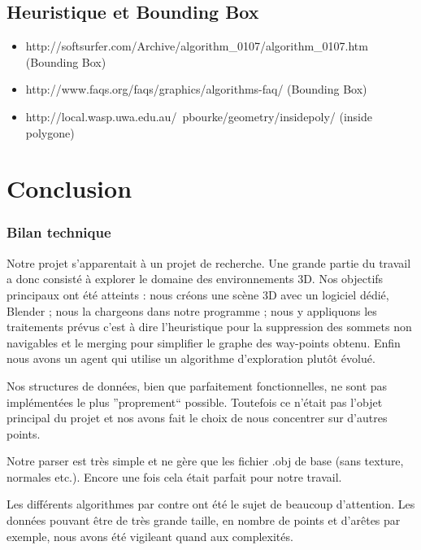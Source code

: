 \documentclass[a4paper,12pt]{report}
\begin{document}
 

\section*{Heuristique et Bounding Box}
\begin{itemize}
 \item http://softsurfer.com/Archive/algorithm\_0107/algorithm\_0107.htm  (Bounding Box)
 
 \item http://www.faqs.org/faqs/graphics/algorithms-faq/  (Bounding Box)
 
 \item http://local.wasp.uwa.edu.au/~pbourke/geometry/insidepoly/  (inside polygone)
\end{itemize} 

\chapter{Conclusion}

\subsection*{Bilan technique}

Notre projet s'apparentait à un projet de recherche. Une grande partie du travail a donc consisté à explorer le domaine des environnements 3D. Nos objectifs principaux ont été atteints : nous créons une scène 3D avec un logiciel dédié, Blender ; nous la chargeons dans notre programme ; nous y appliquons les traitements prévus c'est à dire l'heuristique pour la suppression des sommets non navigables et le merging pour simplifier le graphe des way-points obtenu. Enfin nous avons un agent qui utilise un algorithme d'exploration plutôt évolué.

Nos structures de données, bien que parfaitement fonctionnelles, ne sont pas implémentées le plus ''proprement`` possible. Toutefois ce n'était pas l'objet principal du projet et nos avons fait le choix de nous concentrer sur d'autres points.

Notre parser est très simple et ne gère que les fichier .obj de base (sans texture, normales etc.). Encore une fois cela était parfait pour notre travail.

Les différents algorithmes par contre ont été le sujet de beaucoup d'attention. Les données pouvant être de très grande taille, en nombre de points et d'arêtes par exemple, nous avons été vigileant quand aux complexités.
\end{document}
